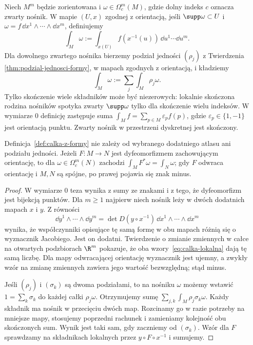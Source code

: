 \begin{definicja}
\label{def:calka-z-formy}
Niech $M^m$ będzie zorientowana i
$\omega\in\Omega_c^m(M)$, gdzie dolny indeks $c$
oznacza zwarty nośnik. W mapie $(U,x)$ zgodnej z
orientacją, jeśli $\supp\omega\subset U$ i
$\omega=f\,\dd x^1\wedge\cdots\wedge\dd x^m$,
definiujemy
\begin{equation}\label{eq:calka-lokalna}
 \int_M\omega:=\int_{x(U)} f(x^{-1}(u))\,\dd u^1\cdots\dd u^m.
\end{equation}
Dla dowolnego zwartego nośnika bierzemy podział
jedności $(\rho_j)$ z Twierdzenia
\ref{thm:podzial-jednosci-formy}, w mapach zgodnych
z orientacją, i kładziemy
\begin{equation}\label{eq:calka-globalna}
 \int_M\omega:=\sum_j\int_M\rho_j\omega.
\end{equation}
Tylko skończenie wiele składników może być niezerowych:
lokalnie skończona rodzina nośników spotyka zwarty
$\supp\omega$ tylko dla skończenie wielu indeksów.
W wymiarze $0$ definicję zastępuje suma
$\int_M f=\sum_{p\in M}\varepsilon_p f(p)$,
gdzie $\varepsilon_p\in\{1,-1\}$ jest orientacją punktu.
Zwarty nośnik w przestrzeni dyskretnej jest skończony.
\end{definicja}

\begin{twierdzenie}
\label{thm:calka-dobrze-okreslona}
Definicja~\ref{def:calka-z-formy} nie zależy od
wybranego dodatniego atlasu ani podziału jedności.
Jeżeli $F:M\to N$ jest dyfeomorfizmem zachowującym
orientację, to dla $\omega\in\Omega_c^m(N)$ zachodzi
$\int_M F^*\omega=\int_N\omega$; gdy $F$ odwraca
orientację i $M,N$ są spójne, po prawej pojawia się
znak minus.
\end{twierdzenie}
\begin{proof}
W wymiarze $0$ teza wynika z sumy ze znakami i z tego,
że dyfeomorfizm jest bijekcją punktów. Dla $m\geq1$
najpierw niech nośnik leży w dwóch dodatnich mapach
$x$ i $y$. Z równości
\[
 \dd y^1\wedge\cdots\wedge\dd y^m
 =\det D(y\circ x^{-1})\,
   \dd x^1\wedge\cdots\wedge\dd x^m
\]
wynika, że współczynniki opisujące tę samą formę
w obu mapach różnią się o wyznacznik Jacobiego.
Jest on dodatni. Twierdzenie o zmianie zmiennych
w całce na otwartych podzbiorach $\R^m$ pokazuje,
że oba wzory~\eqref{eq:calka-lokalna} dają tę samą
liczbę. Dla mapy odwracającej orientację wyznacznik
jest ujemny, a zwykły wzór na zmianę zmiennych
zawiera jego wartość bezwzględną; stąd minus.

Jeśli $(\rho_j)$ i $(\sigma_k)$ są dwoma podziałami,
to na nośniku $\omega$ możemy wstawić
$1=\sum_k\sigma_k$ do każdej całki $\rho_j\omega$.
Otrzymujemy sumę $\sum_{j,k}\int_M\rho_j\sigma_k\omega$.
Każdy składnik ma nośnik w przecięciu dwóch map.
Rozcinamy go w razie potrzeby na mniejsze mapy,
stosujemy poprzedni rachunek i zamieniamy kolejność
obu skończonych sum. Wynik jest taki sam, gdy
zaczniemy od $(\sigma_k)$. Wzór dla $F$ sprawdzamy
na składnikach lokalnych przez $y\circ F\circ x^{-1}$
i sumujemy.
\end{proof}

